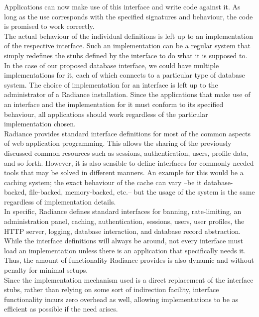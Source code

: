\documentclass{sig-alternate-05-2015}
\begin{document}
Applications can now make use of this interface and write code against it. As long as the use corresponds with the specified signatures and behaviour, the code is promised to work correctly. \\

The actual behaviour of the individual definitions is left up to an implementation of the respective interface. Such an implementation can be a regular system that simply redefines the stubs defined by the interface to do what it is supposed to. In the case of our proposed database interface, we could have multiple implementations for it, each of which connects to a particular type of database system. The choice of implementation for an interface is left up to the administrator of a Radiance installation. Since the applications that make use of an interface and the implementation for it must conform to its specified behaviour, all applications should work regardless of the particular implementation chosen. \\

Radiance provides standard interface definitions for most of the common aspects of web application programming. This allows the sharing of the previously discussed common resources such as sessions, authentication, users, profile data, and so forth. However, it is also sensible to define interfaces for commonly needed tools that may be solved in different manners. An example for this would be a caching system; the exact behaviour of the cache can vary --be it database-backed, file-backed, memory-backed, etc.-- but the usage of the system is the same regardless of implementation details. \\

In specific, Radiance defines standard interfaces for banning, rate-limiting, an administration panel, caching, authentication, sessions, users, user profiles, the HTTP server, logging, database interaction, and database record abstraction. While the interface definitions will always be around, not every interface must load an implementation unless there is an application that specifically needs it. Thus, the amount of functionality Radiance provides is also dynamic and without penalty for minimal setups. \\

Since the implementation mechanism used is a direct replacement of the interface stubs, rather than relying on some sort of indirection facility, interface functionality incurs zero overhead as well, allowing implementations to be as efficient as possible if the need arises. \\
\end{document}

